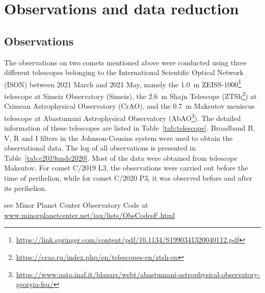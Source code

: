 \section{Observations and data reduction} \label{sec:obs_data}

\subsection{Observations}

The observations on two comets mentioned above were conducted using three different telescopes belonging to the International Scientific Optical Network (ISON) between 2021 March and 2021 May, namely the {\qty{1.0}{\m}} ZEISS-1000\footnote{\url{https://link.springer.com/content/pdf/10.1134/S1990341320040112.pdf}} 
telescope at Simeiz Observatory (Simeiz), the {\qty{2.6}{\m}} Shajn Telescope (ZTSh\footnote{\url{https://crao.ru/index.php/en/telescopes-en/ztsh-en}}) 
at Crimean Astrophysical Observatory (CrAO), and the {\qty{0.7}{\m}} Maksutov meniscus telescope at Abastumani Astrophysical Observatory (AbAO\footnote{\url{https://www.oato.inaf.it/blazars/webt/abastumani-astrophysical-observatory-georgia-fsu/}}). 
The detailed information of these telescopes are listed in Table~\ref{tab:telescope}. Broadband B, V, R and I filters in the Johnson-Cousins system were used to obtain the observational data. The log of all observations is presented in Table~\ref{tab:c2019andc2020}. Most of the data were obtained from telescope Maksutov. For comet C/2019 L3, the observations were carried out before the time of perihelion, while for comet C/2020 P3, it was observed before and after its perihelion. 

\begin{table}
    \centering
    \caption{Information of instruments used. }\label{tab:telescope}
    \begin{threeparttable}
        \begin{tablenotes}
            \item[1] see Minor Planet Center Observatory Code at \\
            \url{www.minorplanetcenter.net/iau/lists/ObsCodesF.html}
        \end{tablenotes}
    \end{threeparttable}
\end{table}

